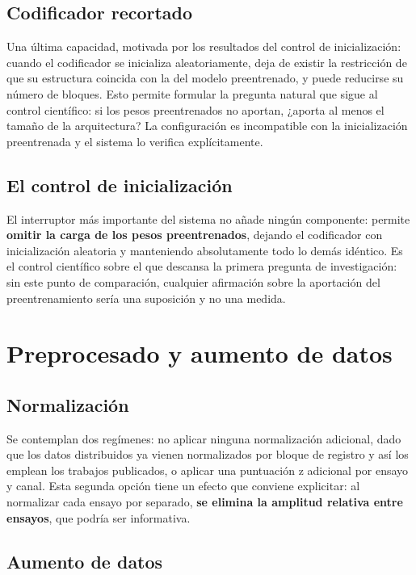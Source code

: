\subsection{Codificador recortado}

Una última capacidad, motivada por los resultados del control de inicialización: cuando el codificador se inicializa aleatoriamente, deja de existir la restricción de que su estructura coincida con la del modelo preentrenado, y puede reducirse su número de bloques. Esto permite formular la pregunta natural que sigue al control científico: si los pesos preentrenados no aportan, ¿aporta al menos el tamaño de la arquitectura? La configuración es incompatible con la inicialización preentrenada y el sistema lo verifica explícitamente.

\subsection{El control de inicialización}
\label{sec:control-init}

El interruptor más importante del sistema no añade ningún componente: permite \textbf{omitir la carga de los pesos preentrenados}, dejando el codificador con inicialización aleatoria y manteniendo absolutamente todo lo demás idéntico. Es el control científico sobre el que descansa la primera pregunta de investigación: sin este punto de comparación, cualquier afirmación sobre la aportación del preentrenamiento sería una suposición y no una medida.

\section{Preprocesado y aumento de datos}
\label{sec:preprocesado-arq}

\subsection{Normalización}

Se contemplan dos regímenes: no aplicar ninguna normalización adicional, dado que los datos distribuidos ya vienen normalizados por bloque de registro y así los emplean los trabajos publicados, o aplicar una puntuación z adicional por ensayo y canal. Esta segunda opción tiene un efecto que conviene explicitar: al normalizar cada ensayo por separado, \textbf{se elimina la amplitud relativa entre ensayos}, que podría ser informativa.

\subsection{Aumento de datos}

